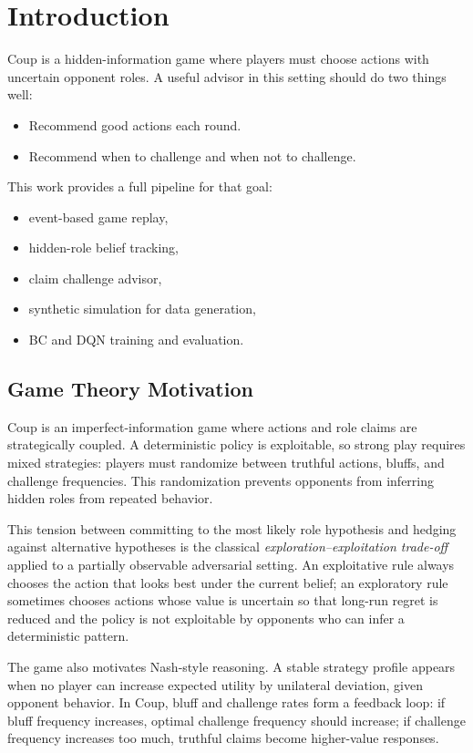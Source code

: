 \documentclass[11pt]{article}
\begin{document}
\section{Introduction}
Coup is a hidden-information game where players must choose actions with uncertain opponent roles. A useful advisor in this setting should do two things well:
\begin{itemize}
  \item Recommend good actions each round.
  \item Recommend when to challenge and when not to challenge.
\end{itemize}

This work provides a full pipeline for that goal:
\begin{itemize}
  \item event-based game replay,
  \item hidden-role belief tracking,
  \item claim challenge advisor,
  \item synthetic simulation for data generation,
  \item BC and DQN training and evaluation.
\end{itemize}

\subsection{Game Theory Motivation}
Coup is an imperfect-information game where actions and role claims are strategically coupled. A deterministic policy is exploitable, so strong play requires mixed strategies: players must randomize between truthful actions, bluffs, and challenge frequencies. This randomization prevents opponents from inferring hidden roles from repeated behavior. 

This tension between committing to the most likely role hypothesis and hedging against alternative hypotheses is the classical \textit{exploration--exploitation trade-off} applied to a partially observable adversarial setting. An exploitative rule always chooses the action that looks best under the current belief; an exploratory rule sometimes chooses actions whose value is uncertain so that long-run regret is reduced and the policy is not exploitable by opponents who can infer a deterministic pattern.

The game also motivates Nash-style reasoning. A stable strategy profile appears when no player can increase expected utility by unilateral deviation, given opponent behavior. In Coup, bluff and challenge rates form a feedback loop: if bluff frequency increases, optimal challenge frequency should increase; if challenge frequency increases too much, truthful claims become higher-value responses.
\end{document}

